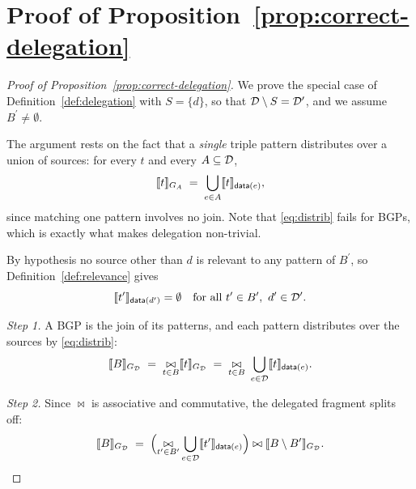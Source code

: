 \section{Proof of Proposition~\ref{prop:correct-delegation}}
\label{app:correct-delegation}

\begin{proof}[Proof of Proposition~\ref{prop:correct-delegation}]
We prove the special case of Definition~\ref{def:delegation} with $S = \{d\}$, so that
$\mathcal{D} \setminus S = \mathcal{D}^{\prime}$, and we assume $B^{\prime} \neq \emptyset$.

The argument rests on the fact that a \emph{single} triple pattern distributes over a
union of sources: for every $t$ and every $A \subseteq \mathcal{D}$,
\begin{equation}
  \llbracket t \rrbracket_{G_{A}} \;=\; \bigcup_{e \in A} \llbracket t \rrbracket_{\mathsf{data}(e)},
  \label{eq:distrib}
\end{equation}
since matching one pattern involves no join. Note that \eqref{eq:distrib} fails for BGPs,
which is exactly what makes delegation non-trivial.

By hypothesis no source other than $d$ is relevant to any pattern of $B^{\prime}$, so
Definition~\ref{def:relevance} gives
\begin{equation}
  \llbracket t^{\prime} \rrbracket_{\mathsf{data}(d^{\prime})} = \emptyset
  \quad \text{for all } t^{\prime} \in B^{\prime},\ d^{\prime} \in \mathcal{D}^{\prime}.
  \label{eq:empty}
\end{equation}

\emph{Step 1.} A BGP is the join of its patterns, and each pattern distributes over the
sources by \eqref{eq:distrib}:
\[
  \llbracket B \rrbracket_{G_{\mathcal{D}}}
  \;=\; \mathop{\bowtie}\limits_{t \in B} \llbracket t \rrbracket_{G_{\mathcal{D}}}
  \;=\; \mathop{\bowtie}\limits_{t \in B} \ \bigcup_{e \in \mathcal{D}} \llbracket t \rrbracket_{\mathsf{data}(e)} .
\]

\emph{Step 2.} Since $\bowtie$ is associative and commutative, the delegated fragment
splits off:
\[
  \llbracket B \rrbracket_{G_{\mathcal{D}}} \;=\;
  \Bigl( \mathop{\bowtie}\limits_{t^{\prime} \in B^{\prime}} \bigcup_{e \in \mathcal{D}}
         \llbracket t^{\prime} \rrbracket_{\mathsf{data}(e)} \Bigr)
  \bowtie \llbracket B \setminus B^{\prime} \rrbracket_{G_{\mathcal{D}}} .
\]


\end{proof}
